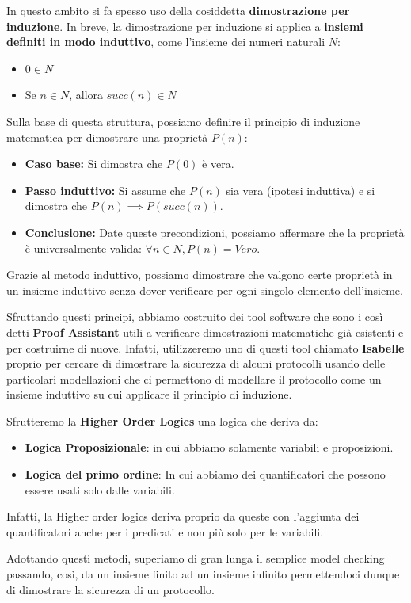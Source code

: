 In questo ambito si fa spesso uso della cosiddetta \textbf{dimostrazione per induzione}. In breve, la dimostrazione per induzione si applica a \textbf{insiemi definiti in modo induttivo}, come l'insieme dei numeri naturali $N$:
\begin{itemize}
    \item $0 \in N$
    \item Se $n \in N$, allora $succ(n) \in N$
\end{itemize}
Sulla base di questa struttura, possiamo definire il principio di induzione matematica per dimostrare una proprietà $P(n)$:
\begin{itemize}
    \item \textbf{Caso base:} Si dimostra che $P(0)$ è vera.
    \item \textbf{Passo induttivo:} Si assume che $P(n)$ sia vera (ipotesi induttiva) e si dimostra che $P(n) \implies P(succ(n))$.  
    \item \textbf{Conclusione:} Date queste precondizioni, possiamo affermare che la proprietà è universalmente valida: $\forall n \in N, P(n) = Vero$.
\end{itemize}
Grazie al metodo induttivo, possiamo dimostrare che valgono certe proprietà in un insieme induttivo senza dover verificare per ogni singolo elemento dell'insieme.

Sfruttando questi principi, abbiamo costruito dei tool software che sono i così detti \textbf{Proof Assistant} utili a verificare dimostrazioni matematiche già esistenti e per costruirne di nuove. Infatti, utilizzeremo uno di questi tool chiamato \textbf{Isabelle} proprio per cercare di dimostrare la sicurezza di alcuni protocolli usando delle particolari modellazioni che ci permettono di modellare il protocollo come un insieme induttivo su cui applicare il principio di induzione.

Sfrutteremo la \textbf{Higher Order Logics} una logica che deriva da:
\begin{itemize}
    \item \textbf{Logica Proposizionale}: in cui abbiamo solamente variabili e proposizioni.
    \item \textbf{Logica del primo ordine}: In cui abbiamo dei quantificatori che possono essere usati solo dalle variabili.
\end{itemize}
Infatti, la Higher order logics deriva proprio da queste con l'aggiunta dei quantificatori anche per i predicati e non più solo per le variabili.

Adottando questi metodi, superiamo di gran lunga il semplice model checking passando, così, da un insieme finito ad un insieme infinito permettendoci dunque di dimostrare la sicurezza di un protocollo.

